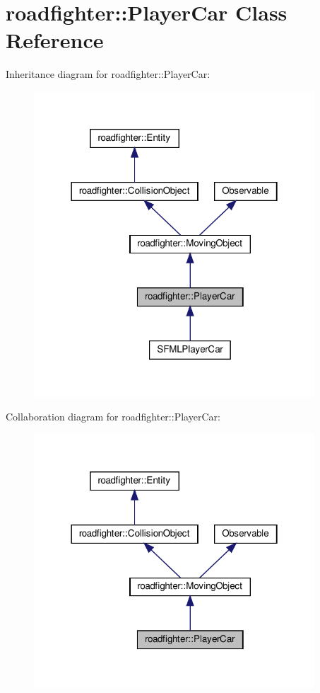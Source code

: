 \hypertarget{classroadfighter_1_1PlayerCar}{}\section{roadfighter\+:\+:Player\+Car Class Reference}
\label{classroadfighter_1_1PlayerCar}


Inheritance diagram for roadfighter\+:\+:Player\+Car\+:\nopagebreak
\begin{figure}[H]
\begin{center}
\leavevmode
\includegraphics[width=298pt]{classroadfighter_1_1PlayerCar__inherit__graph}
\end{center}
\end{figure}


Collaboration diagram for roadfighter\+:\+:Player\+Car\+:\nopagebreak
\begin{figure}[H]
\begin{center}
\leavevmode
\includegraphics[width=298pt]{classroadfighter_1_1PlayerCar__coll__graph}
\end{center}
\end{figure}
